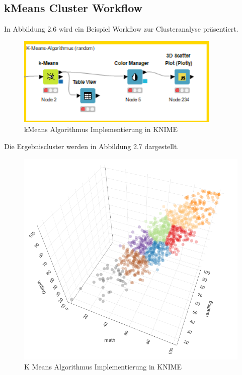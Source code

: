 \documentclass[12pt,					%
							 oneside,			%
							 a4paper,			%
							 halfparskip,		%
							 liststotoc,			%
							 bibtotoc,			%
							 fleqn,				%
							 pointlessnumbers]	%
							 {scrreprt}
\begin{document}
	\newpage
	
		\subsection{kMeans Cluster Workflow}
		In Abbildung 2.6 wird ein Beispiel Workflow zur Clusteranalyse präsentiert. 
		
		\begin{figure}[!h]
			\begin{center}
				\includegraphics[scale=1]{pictures/kmeans.png}
				\caption{kMeans Algorithmus Implementierung in KNIME}
			\end{center}
		\end{figure}
		
		Die Ergebniscluster werden in Abbildung 2.7 dargestellt.
		
		\begin{figure}[!h]
			\begin{center}
				\includegraphics[scale=0.6]{pictures/cluster.png}
				\caption{K Means Algorithmus Implementierung in KNIME}
			\end{center}
		\end{figure}
		
\end{document}
